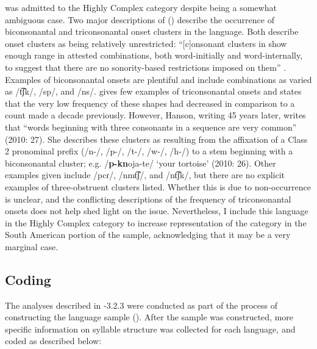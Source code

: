    was admitted to the Highly Complex category despite being a somewhat ambiguous case. Two major descriptions of  (\citealt{Hanson2010,Matteson1965}) describe the occurrence of biconsonantal and triconsonantal onset clusters in the language. Both describe onset clusters as being relatively unrestricted: “[c]onsonant clusters in  show enough range in attested combinations, both word-initially and word-internally, to suggest that there are no sonority-based restrictions imposed on them” \citep[27]{Hanson2010}. Examples of biconsonantal onsets are plentiful and include combinations as varied as /t͡ʃk/, /sp/, and /ns/. \citet[24]{Matteson1965} gives few examples of triconsonantal onsets and states that the very low frequency of these shapes had decreased in comparison to a count made a decade previously. However, Hanson, writing 45 years later, writes that “words beginning with three consonants in a sequence are very common” (2010: 27). She describes these clusters as resulting from the affixation of a Class 2 pronominal prefix (/n-/, /p-/, /t-/, /w-/, /h-/) to a stem beginning with a biconsonantal cluster; e.g. /\textbf{p-kn}oja-te/ ‘your tortoise’ (2010: 26). Other examples given include /pcɾ/, /nmt͡ʃ/, and /nt͡ʃk/, but there are no explicit examples of three-obstruent clusters listed. Whether this is due to non-occurrence is unclear, and the conflicting descriptions of the frequency of triconsonantal onsets does not help shed light on the issue. Nevertheless, I include this language in the Highly Complex category to increase representation of the category in the South American portion of the sample, acknowledging that it may be a very marginal case.

\subsection{Coding}\label{sec:3.2.4}

  The analyses described in -3.2.3 were conducted as part of the process of constructing the language sample (). After the sample was constructed, more specific information on syllable structure was collected for each language, and coded as described below:

